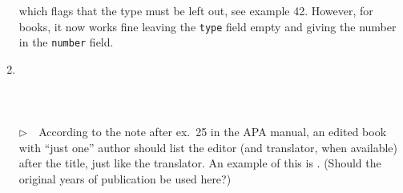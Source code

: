 \documentclass{article}
\newcommand{\EM}{\ensuremath{\triangleright\quad}}
\newcommand{\fieldname}[1]{\texttt{#1}}%
\begin{document}
\begin{enumerate}
\begin{verbatim}
\end{verbatim}
      which flags that the type must be left out, see example 42.
      However, for books, it now works fine leaving the \fieldname{type}
      field empty and giving the number in the \fieldname{number} field.
\item \cite{ex25} \\ \cite{ex25}\\ \\ \\
      \EM According to the note after ex.~25 in the APA manual,
      an edited book with ``just one'' author should list
      the editor (and translator, when available) after the
      title, just like the translator. An example of this is
      . (Should the original years of publication
      be used here?)


\end{enumerate}
\end{document}
